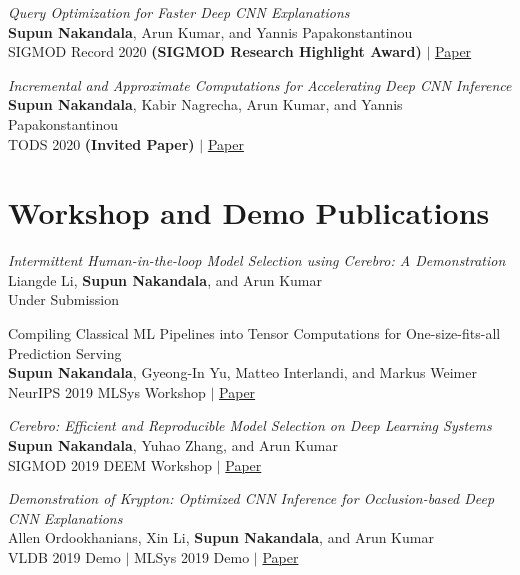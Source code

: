 \documentclass[margin]{res}
\begin{document}
\begin{resume}
\par
\textit{Query Optimization for Faster Deep CNN Explanations} \\
\textbf{Supun Nakandala}, Arun Kumar, and Yannis Papakonstantinou\\
SIGMOD Record 2020 \textbf{(SIGMOD Research Highlight Award)} $|$ \href{https://adalabucsd.github.io/papers/2020_Krypton_SIGMODRecord.pdf}{Paper}

\par
\textit{Incremental and Approximate Computations for Accelerating Deep CNN Inference} \\
\textbf{Supun Nakandala}, Kabir Nagrecha, Arun Kumar, and Yannis Papakonstantinou\\
TODS 2020 \textbf{(Invited Paper)} $|$ \href{https://adalabucsd.github.io/papers/2020_Krypton_TODS.pdf}{Paper}


\section{Workshop and Demo Publications}
\par
\textit{Intermittent Human-in-the-loop Model Selection using Cerebro: A Demonstration} \\
Liangde Li, \textbf{Supun Nakandala}, and Arun Kumar\\
Under Submission

\par
Compiling Classical ML Pipelines into Tensor Computations for One-size-fits-all Prediction Serving \\
\textbf{Supun Nakandala}, Gyeong-In Yu, Matteo Interlandi, and Markus Weimer\\
NeurIPS 2019 MLSys Workshop $|$ \href{http://learningsys.org/neurips19/assets/papers/27_CameraReadySubmission_Hummingbird%20(5).pdf}{Paper}

\par
\textit{Cerebro: Efficient and Reproducible Model Selection on Deep Learning Systems} \\
\textbf{Supun Nakandala}, Yuhao Zhang, and Arun Kumar\\
SIGMOD 2019 DEEM Workshop $|$ \href{https://adalabucsd.github.io/papers/2019_Cerebro_DEEM.pdf}{Paper}

\par
\textit{Demonstration of Krypton: Optimized CNN Inference for Occlusion-based Deep CNN Explanations} \\
Allen Ordookhanians, Xin Li, \textbf{Supun Nakandala}, and Arun Kumar\\
VLDB 2019 Demo $|$ MLSys 2019 Demo $|$ \href{http://www.vldb.org/pvldb/vol12/p1894-ordookhanians.pdf}{Paper}


\end{resume}
\end{document}
